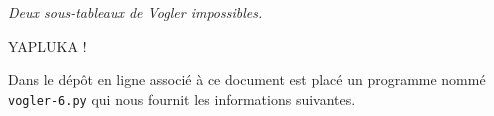 \begin{center}
	
	\smallskip
	
	\emph{\small Deux sous-tableaux de Vogler impossibles.}
\end{center}


{\Huge YAPLUKA !}

Dans le dépôt en ligne associé à ce document est placé un programme nommé \verb#vogler-6.py# qui nous fournit les informations suivantes.
